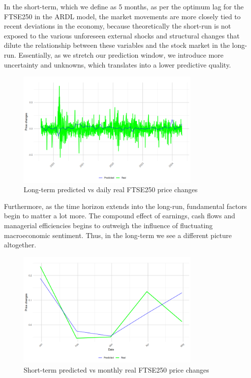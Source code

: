 \documentclass[11pt,a4paper]{article}
\begin{document}
In the short-term, which we define as 5 months, 
as per the optimum lag for the FTSE250 in the ARDL model, the market movements
are more closely tied to recent deviations in the economy, because theoretically
the short-run is not exposed to the various unforeseen external shocks and structural changes
that dilute the relationship between these variables and the stock market in the 
long-run. Essentially, as we stretch our prediction window, we 
introduce more uncertainty and unknowns, which translates into a 
lower predictive quality.

\begin{figure}[h]
    \centering
    \includegraphics[width=0.8\textwidth]{long-term-daily.png}
    \caption{Long-term predicted vs daily real FTSE250 price changes}
    \label{fig:ldaily}
\end{figure}

Furthermore, as the time horizon extends into the long-run, fundamental factors 
begin to matter a lot more. The compound effect of earnings, cash flows and
managerial efficiencies begins to outweigh the 
influence of fluctuating macroeconomic sentiment. Thus, in the long-term
we see a different picture altogether.

\begin{figure}[h]
    \centering
    \includegraphics[width=0.8\textwidth]{short-term-monthly.png}
    \caption{Short-term predicted vs monthly real FTSE250 price changes}
    \label{fig:smonthly}
\end{figure}
\end{document}
